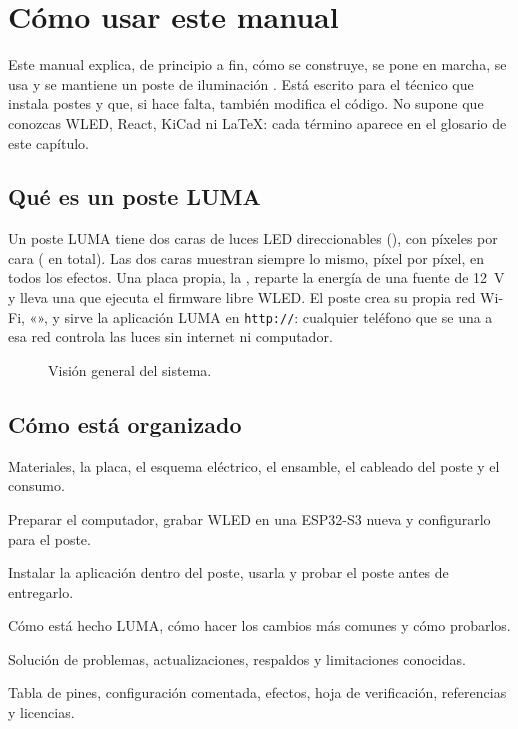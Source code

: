 \chapter{Cómo usar este manual}

Este manual explica, de principio a fin, cómo se construye, se pone en marcha, se usa y se mantiene un poste de iluminación . Está escrito para el técnico que instala postes y que, si hace falta, también modifica el código. No supone que conozcas WLED, React, KiCad ni LaTeX: cada término aparece en el glosario de este capítulo.

\section{Qué es un poste LUMA}

Un poste LUMA tiene dos caras de luces LED direccionables (), con  píxeles por cara ( en total). Las dos caras muestran siempre lo mismo, píxel por píxel, en todos los efectos. Una placa propia, la , reparte la energía de una fuente de 12~V y lleva una  que ejecuta el firmware libre WLED. El poste crea su propia red Wi-Fi, «», y sirve la aplicación LUMA en \texttt{http://}: cualquier teléfono que se una a esa red controla las luces sin internet ni computador.

\begin{figure}[H]\centering
\resizebox{\linewidth}{!}{}
\caption{Visión general del sistema.}\label{fig:bloques}
\end{figure}

\section{Cómo está organizado}

\begin{description}[style=nextline, leftmargin=0pt]
\item[Parte I · Hardware] Materiales, la placa, el esquema eléctrico, el ensamble, el cableado del poste y el consumo.
\item[Parte II · Firmware] Preparar el computador, grabar WLED en una ESP32-S3 nueva y configurarlo para el poste.
\item[Parte III · App LUMA] Instalar la aplicación dentro del poste, usarla y probar el poste antes de entregarlo.
\item[Parte IV · El código] Cómo está hecho LUMA, cómo hacer los cambios más comunes y cómo probarlos.
\item[Parte V · Operación] Solución de problemas, actualizaciones, respaldos y limitaciones conocidas.
\item[Anexos] Tabla de pines, configuración comentada, efectos, hoja de verificación, referencias y licencias.
\end{description}

